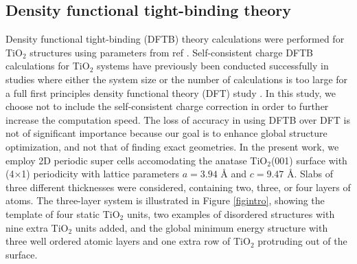 \documentclass[aip,amsmath,amssymb,reprint]{revtex4-1}
\begin{document}
\subsection{Density functional tight-binding theory}
Density functional tight-binding (DFTB) theory calculations were
performed for TiO$_2$ structures using parameters from ref \cite{dolgonos2010}. Self-consistent charge DFTB calculations for TiO$_2$ systems have previously been conducted
successfully in studies where either the system size or the number of calculations is too large for a full first principles density functional theory (DFT) study \cite{Selli2017a, Selli2017b}. In this study, we choose not to include the self-consistent charge correction in order to further increase the computation speed. The loss of accuracy in using DFTB over DFT is not of significant importance because our goal is to enhance global structure optimization, and not that of finding exact geometries. In the present work, we
employ 2D periodic super cells accomodating the anatase TiO$_2$(001)
surface with (4$\times$1) periodicity with lattice parameters $a=3.94$ {\AA} and $c=9.47$ {\AA}. Slabs of three different
thicknesses were considered, containing two, three, or four layers of
atoms. The three-layer system is illustrated in Figure \ref{figintro},
showing the template of four static TiO$_2$ units, two examples of
disordered structures with nine extra TiO$_2$ units added, and the
global minimum energy structure with three well ordered atomic layers
and one extra row of TiO$_2$ protruding out of the surface.
\end{document}
